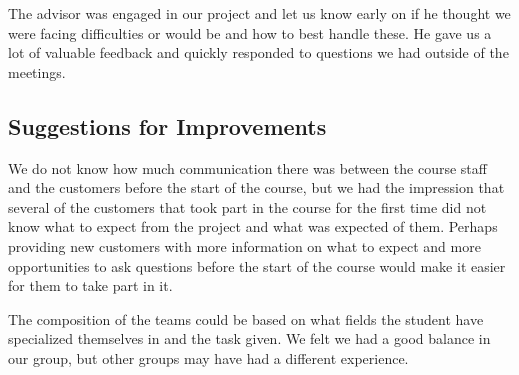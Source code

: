 
	The advisor was engaged in our project and let us know early on if he thought we were facing difficulties or would be and how to best handle these. He gave us a lot of valuable feedback and quickly responded to questions we had outside of the meetings.

\subsection{Suggestions for Improvements}

	We do not know how much communication there was between the course staff and the customers 
	before the start of the course, but we had the impression that several of the customers that 
	took part in the course for the first time did not know what to expect from the project and 
	what was expected of them. Perhaps providing new customers with more information on what to expect 
	and more opportunities to ask questions before the start of the course would make it easier for 
	them to take part in it.

	The composition of the teams could be based on what fields the student have specialized themselves 
	in and the task given. We felt we had a good balance in our group, but other groups may have had a 
	different experience.





	










